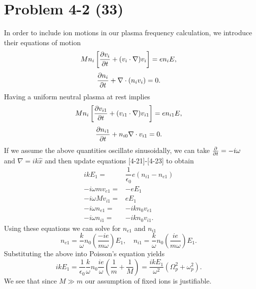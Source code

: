 \section*{Problem 4-2 (33)}
\label{sec:4-2}
In order to include ion motions in our plasma frequency calculation, we introduce their equations of motion
\begin{equation*}
	Mn_i\left[\frac{\partial v_i}{\partial t} + (v_i \cdot \nabla)v_i \right] = en_iE,
\end{equation*}
\begin{equation*}
	\frac{\partial n_i}{\partial t} + \nabla \cdot (n_iv_i)  = 0.
\end{equation*}
Having a uniform neutral plasma at rest implies
\begin{equation*}
	Mn_i\left[\frac{\partial v_{i1}}{\partial t} + (v_{i1} \cdot \nabla)v_{i1} \right] = en_{i1}E,
\end{equation*}
\begin{equation*}
	\frac{\partial n_{i1}}{\partial t} + n_{i0}\nabla \cdot v_{i1}  = 0.
\end{equation*}
If we assume the above quantities oscillate sinusoidally, we can take \(\frac{\partial }{\partial t} = -i\omega\) and \(\nabla = ik\hat{x} \) and then update equations [4-21]-[4-23] to obtain
\begin{align*}
	ikE_1 =& \dfrac{1}{\epsilon_0}e(n_{i1} - n_{e1})\\
	-i\omega m v_{e1} =& -eE_1 \\
	-i\omega M v_{i1} =& eE_1 \\
	-i\omega n_{e1} =& -ikn_0 v_{e1}\\
	-i\omega n_{i1} =& -ikn_0 v_{i1}.
\end{align*}
Using these equations we can solve for \(n_{e1} \) and \(n_{i1}\)
\begin{equation*}
n_{e1} = \dfrac{k}{\omega}n_0\left(\dfrac{-ie}{m\omega} \right)E_1, \quad n_{i1} = \dfrac{k}{\omega}n_0\left(\dfrac{ie}{m\omega} \right)E_1.
\end{equation*}
Substituting the above into Poisson's equation yields
\begin{equation*}
	ikE_1 = \dfrac{1}{\epsilon_0}\dfrac{k}{\omega} n_0\dfrac{ie}{\omega}\left(\dfrac{1}{m} + \dfrac{1}{M}\right) = \dfrac{ikE_1}{\omega^2}\left(\Omega_p^2 + \omega_p^2 \right).
\end{equation*}
We see that since \(M \gg m\) our assumption of fixed ions is justifiable.


